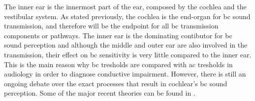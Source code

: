 The inner ear is the innermost part of the ear, composed by the cochlea and the vestibular system. As stated previously, the cochlea is the end-organ for \gls{bc} sound transmission, and therefore will be the endpoint for all \gls{bc} transmission components or pathways. The inner ear is the dominating contibutor for \gls{bc} sound perception and although the middle and outer ear are also involved in the transmission, their effect on \gls{bc} sensitivity is very little compared to the inner ear. This is the main reason why \gls{bc} tresholds are compared with \gls{ac} tresholds in audiology in order to diagnose conductive impairment. However, there is still an ongoing debate over the exact processes that result in cochlear's \gls{bc} sound perception. Some of the major recent theories can be found in \citep[Sec. 6.3.3]{puria_2013}.
